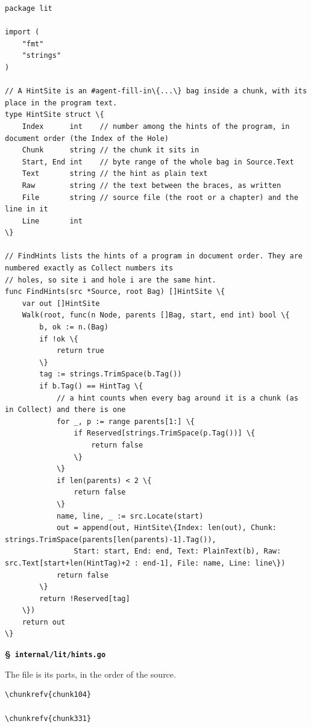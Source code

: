 \documentclass[10pt,a4paper]{article}
\makeatletter
\newcounter{chunk}
\renewcommand{\thechunk}{\S\arabic{chunk}}
\newcommand{\chunkhead}[2]{\par\addvspace{1.2ex}\noindent\refstepcounter{chunk}\label{#1}{\bfseries\thechunk}\enspace #2\par\nopagebreak}
\newcommand{\chunkrefv}[1]{\hyperref[#1]{\ensuremath{\langle}\csname cn@#1\endcsname\ensuremath{\rangle}\textsuperscript{\ref*{#1}}}}
\newcommand{\filebadge}{{\footnotesize\itshape\color{tuftegray}file}}
\makeatother
\begin{document}
\begin{Verbatim}
package lit

import (
	"fmt"
	"strings"
)

// A HintSite is an #agent-fill-in\{...\} bag inside a chunk, with its place in the program text.
type HintSite struct \{
	Index      int    // number among the hints of the program, in document order (the Index of the Hole)
	Chunk      string // the chunk it sits in
	Start, End int    // byte range of the whole bag in Source.Text
	Text       string // the hint as plain text
	Raw        string // the text between the braces, as written
	File       string // source file (the root or a chapter) and the line in it
	Line       int
\}

// FindHints lists the hints of a program in document order. They are numbered exactly as Collect numbers its
// holes, so site i and hole i are the same hint.
func FindHints(src *Source, root Bag) []HintSite \{
	var out []HintSite
	Walk(root, func(n Node, parents []Bag, start, end int) bool \{
		b, ok := n.(Bag)
		if !ok \{
			return true
		\}
		tag := strings.TrimSpace(b.Tag())
		if b.Tag() == HintTag \{
			// a hint counts when every bag around it is a chunk (as in Collect) and there is one
			for _, p := range parents[1:] \{
				if Reserved[strings.TrimSpace(p.Tag())] \{
					return false
				\}
			\}
			if len(parents) < 2 \{
				return false
			\}
			name, line, _ := src.Locate(start)
			out = append(out, HintSite\{Index: len(out), Chunk: strings.TrimSpace(parents[len(parents)-1].Tag()),
				Start: start, End: end, Text: PlainText(b), Raw: src.Text[start+len(HintTag)+2 : end-1], File: name, Line: line\})
			return false
		\}
		return !Reserved[tag]
	\})
	return out
\}
\end{Verbatim}

\chunkhead{chunk105}{\filebadge\ \textbf{\texttt{internal/\allowbreak{}lit/\allowbreak{}hints.\allowbreak{}go}}}
The file is its parts, in the order of the source.
\begin{Verbatim}
\chunkrefv{chunk104}

\chunkrefv{chunk331}
\end{Verbatim}
\end{document}
